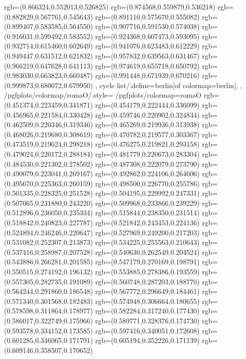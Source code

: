 {{{			rgb=(0.866324,0.552013,0.526825)
			rgb=(0.874568,0.559879,0.536218)
			rgb=(0.882829,0.567761,0.545643)
			rgb=(0.891110,0.575670,0.555082)
			rgb=(0.899407,0.583585,0.564550)
			rgb=(0.907716,0.591530,0.574038)
			rgb=(0.916031,0.599492,0.583552)
			rgb=(0.924368,0.607473,0.593095)
			rgb=(0.932714,0.615460,0.602649)
			rgb=(0.941076,0.623483,0.612229)
			rgb=(0.949447,0.631512,0.621832)
			rgb=(0.957832,0.639563,0.631467)
			rgb=(0.966219,0.647628,0.641113)
			rgb=(0.974619,0.655718,0.650792)
			rgb=(0.983030,0.663823,0.660487)
			rgb=(0.991448,0.671939,0.670216)
			rgb=(0.999873,0.680072,0.679950)
		},
	cycle list/.define={berlin}{[of colormap=berlin]},
	},
	/pgfplots/colormap/romaO/.style={
		/pgfplots/colormap={romaO}{%
			rgb=(0.451374,0.223459,0.341871)
			rgb=(0.454179,0.222444,0.336099)
			rgb=(0.456965,0.221584,0.330428)
			rgb=(0.459746,0.220902,0.324834)
			rgb=(0.462509,0.220346,0.319346)
			rgb=(0.465269,0.219936,0.313938)
			rgb=(0.468026,0.219680,0.308619)
			rgb=(0.470782,0.219577,0.303367)
			rgb=(0.473519,0.219624,0.298218)
			rgb=(0.476275,0.219821,0.293158)
			rgb=(0.479024,0.220172,0.288184)
			rgb=(0.481779,0.220673,0.283304)
			rgb=(0.484530,0.221302,0.278502)
			rgb=(0.487308,0.222079,0.273790)
			rgb=(0.490079,0.223041,0.269167)
			rgb=(0.492862,0.224106,0.264606)
			rgb=(0.495670,0.225363,0.260159)
			rgb=(0.498500,0.226770,0.255786)
			rgb=(0.501335,0.228325,0.251528)
			rgb=(0.504195,0.229992,0.247331)
			rgb=(0.507065,0.231880,0.243220)
			rgb=(0.509968,0.233866,0.239229)
			rgb=(0.512896,0.236050,0.235334)
			rgb=(0.515844,0.238350,0.231514)
			rgb=(0.518842,0.240823,0.227787)
			rgb=(0.521842,0.243453,0.224136)
			rgb=(0.524894,0.246246,0.220647)
			rgb=(0.527969,0.249200,0.217203)
			rgb=(0.531082,0.252307,0.213873)
			rgb=(0.534225,0.255563,0.210643)
			rgb=(0.537416,0.258987,0.207528)
			rgb=(0.540630,0.262549,0.204524)
			rgb=(0.543886,0.266281,0.201585)
			rgb=(0.547179,0.270169,0.198791)
			rgb=(0.550515,0.274192,0.196132)
			rgb=(0.553885,0.278386,0.193559)
			rgb=(0.557305,0.282735,0.191089)
			rgb=(0.560748,0.287203,0.188770)
			rgb=(0.564244,0.291860,0.186548)
			rgb=(0.567772,0.296649,0.184461)
			rgb=(0.571340,0.301568,0.182483)
			rgb=(0.574948,0.306664,0.180655)
			rgb=(0.578598,0.311864,0.178977)
			rgb=(0.582284,0.317240,0.177430)
			rgb=(0.586017,0.322749,0.175966)
			rgb=(0.589771,0.328376,0.174730)
			rgb=(0.593578,0.334152,0.173585)
			rgb=(0.597416,0.340051,0.172608)
			rgb=(0.601285,0.346065,0.171791)
			rgb=(0.605194,0.352226,0.171139)
			rgb=(0.609146,0.358507,0.170652)
}}}
